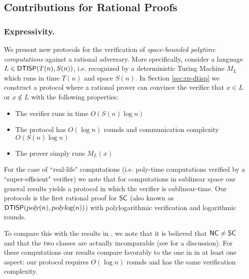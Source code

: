 \subsection{Contributions for Rational Proofs}

\subsubsection{Expressivity.}
We present new protocols for the verification of {\em space-bounded polytime computations} against a rational adversary. More specifically, consider a language $L \in {\ensuremath{\mathsf{DTISP}}}(T(n), S(n))$, i.e. recognized by a deterministic Turing Machine $M_L$ which runs in time $T(n)$ and space $S(n)$. 
In Section \ref{sec:rp-dtisp} we construct a protocol where a rational prover can
convince the verifier that $x \in L$ or $x \notin L$ with the following properties: 
\begin{itemize}
	\item The verifier runs in time $O(S(n) \log n)$
	\item The protocol has $O(\log n)$ rounds and communication complexity $O(S(n) \log n)$
	\item The prover simply runs $M_L(x)$ 
\end{itemize}

For the case of ``real-life" computations (i.e. poly-time computations verified by a ``super-efficient" verifier) we 
note that for computations in sublinear space our general results yields a protocol in which the verifier is sublinear-time. Our protocols is the first rational proof for ${\mathsf{SC}}$ (also known as ${\mathsf{DTISP}}({\textsl{poly}}(n), {\textsl{polylog}}(n))$) with polylogarithmic verification and logarithmic rounds. 

To compare this with the results in \cite{ratsumchecks}, we note that it is believed that ${\mathsf{NC}} \not = {\mathsf{SC}}$ and that the two classes are actually incomparable (see \cite{SCcompleteness} for a discussion). For these computations our results compare
favorably to the one in \cite{ratsumchecks} in at least one aspect: our protocol requires $O(\log n )$ rounds and has the same verification complexity.

